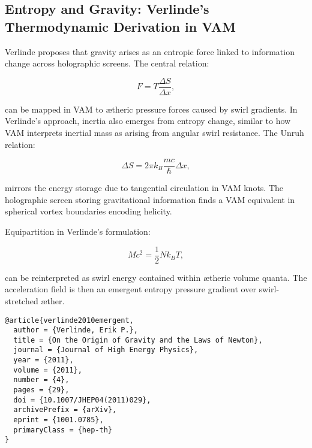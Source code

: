 
\subsection{Entropy and Gravity: Verlinde’s Thermodynamic Derivation in VAM}

Verlinde \cite{verlinde2010emergent} proposes that gravity arises as an entropic force linked to information change across holographic screens. The central relation:

\begin{equation}
F = T \frac{\Delta S}{\Delta x},
\end{equation}

can be mapped in VAM to ætheric pressure forces caused by swirl gradients. In Verlinde's approach, inertia also emerges from entropy change, similar to how VAM interprets inertial mass as arising from angular swirl resistance. The Unruh relation:

\begin{equation}
\Delta S = 2\pi k_B \frac{mc}{\hbar} \Delta x,
\end{equation}

mirrors the energy storage due to tangential circulation in VAM knots. The holographic screen storing gravitational information finds a VAM equivalent in spherical vortex boundaries encoding helicity.

Equipartition in Verlinde's formulation:

\begin{equation}
M c^2 = \frac{1}{2} N k_B T,
\end{equation}

can be reinterpreted as swirl energy contained within ætheric volume quanta. The acceleration field is then an emergent entropy pressure gradient over swirl-stretched æther.

\begin{verbatim}
@article{verlinde2010emergent,
  author = {Verlinde, Erik P.},
  title = {On the Origin of Gravity and the Laws of Newton},
  journal = {Journal of High Energy Physics},
  year = {2011},
  volume = {2011},
  number = {4},
  pages = {29},
  doi = {10.1007/JHEP04(2011)029},
  archivePrefix = {arXiv},
  eprint = {1001.0785},
  primaryClass = {hep-th}
}
\end{verbatim}

